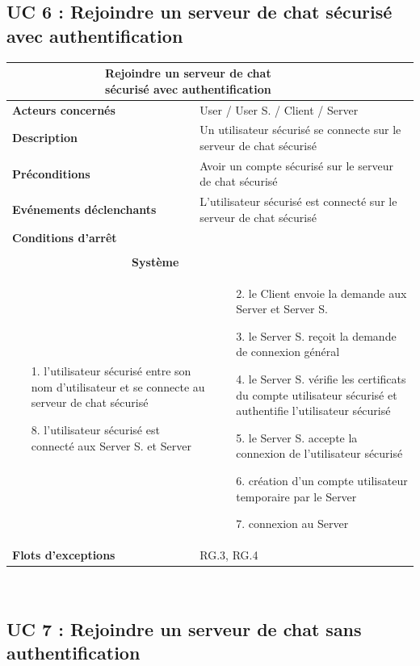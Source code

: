 \documentclass[a4paper,11pt,french]{article}
\newcommand{\fiche}[9] {
	\noindent
\begin{tabular}{|p{3.5cm}| p{1cm} | p{3cm} | p{.5cm} | p{7cm}|} 
\hline
\rowcolor{blue}
\multicolumn{2}{|l|}{\color{white}\bfseries{Nom}} & \multicolumn{3}{l|}{\color{white}\bfseries{#1}}\\
\hline
\multicolumn{2}{|l|}{\bfseries{Acteurs concernés}} & \multicolumn{3}{m{10.5cm}|}{#2}\\
\hline
\multicolumn{2}{|l|}{\bfseries{Description}} & \multicolumn{3}{m{10.5cm}|}{#3}\\
\hline
\multicolumn{2}{|l|}{\bfseries{Préconditions}} & \multicolumn{3}{m{10.5cm}|}{#4}\\
\hline
\multicolumn{2}{|l|}{\bfseries{Evénements déclenchants}} & \multicolumn{3}{m{10.5cm}|}{#5}\\
\hline
\multicolumn{2}{|l|}{\bfseries{Conditions d'arrêt}} & \multicolumn{3}{m{10.5cm}|}{#6}\\
\hline
\rowcolor{gray}
\multicolumn{5}{|c|}{\bfseries{Description du flot d'événements principal}}\\
\hline
\rowcolor{gray}
\multicolumn{3}{|c|}{\bfseries{Acteur(s)}} & \multicolumn{2}{c|}{\bfseries{Système}}\\
\hline
\multicolumn{3}{|p{7.5cm}|}{#7} & \multicolumn{2}{p{7.5cm}|}{#8}\\
\hline
\multicolumn{2}{|l}{\bfseries{Flots d'exceptions}} & \multicolumn{3}{|p{11.5cm}|}{#9}\\
\hline
\end{tabular}
\\
}
\begin{document}
\subsection{UC 6 : Rejoindre un serveur de chat sécurisé avec authentification}

\fiche
	{Rejoindre un serveur de chat sécurisé avec authentification} %
	{User / User S. / Client / Server} %
	{Un utilisateur sécurisé se connecte sur le serveur de chat sécurisé} %
	{Avoir un compte sécurisé  sur le serveur de chat sécurisé} %
	{L’utilisateur sécurisé est connecté sur le serveur de chat sécurisé} %
	{} %
	{\begin{itemize}  %
		\item [1.] l’utilisateur sécurisé entre son nom d’utilisateur et se connecte au serveur de chat sécurisé
		\item [] 
		\item [] 
		\item [] 
		\item [] 
		\item [] 
		\item [] 
		\item [] 
		\item [] 
		\item []  
		\item [8.] l’utilisateur sécurisé est connecté aux Server S. et Server
	 \end{itemize}
	} 
	{\begin{itemize}  %
		\item []
		\item [2.] le Client envoie la demande aux Server et Server S.
		\item [3.] le Server S. reçoit la demande de connexion général
		\item [4.] le Server S. vérifie les certificats du compte utilisateur sécurisé et authentifie l’utilisateur sécurisé
		\item [5.] le Server S. accepte la connexion de l’utilisateur sécurisé
		\item [6.] création d’un compte utilisateur temporaire par le Server
		\item [7.] connexion au Server
	 \end{itemize}
	 }
	{RG.3, RG.4} %

\subsection{UC 7 : Rejoindre un serveur de chat sans authentification}
\end{document}
